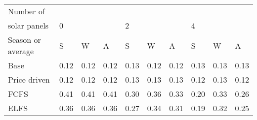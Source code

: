 \begin{table}[h] 
\centering 
\begin{tabular}{l|lll|lll|lll}Number of \\ solar panels&0& & &2& & &4& & \\ \hline 
Season or average & S & W & A & S & W & A & S & W & A \\ \hline 
Base&0.12&0.12&0.12&0.13&0.12&0.12&0.13&0.13&0.13 \\ 
Price driven&0.12&0.12&0.12&0.13&0.13&0.13&0.12&0.13&0.12 \\ 
FCFS&0.41&0.41&0.41&0.30&0.36&0.33&0.20&0.33&0.26 \\ 
ELFS&0.36&0.36&0.36&0.27&0.34&0.31&0.19&0.32&0.25 \\ 
\end{tabular} 
\end{table}
